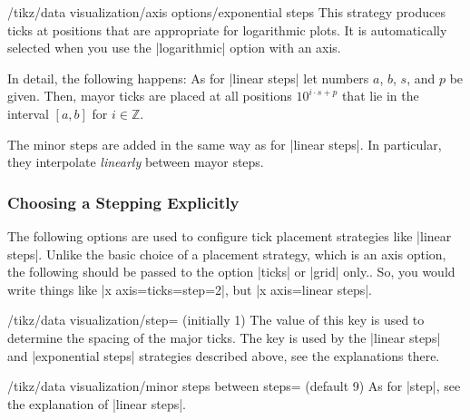\begin{key}{/tikz/data visualization/axis options/exponential steps}
  This strategy produces ticks at positions that are appropriate for
  logarithmic plots. It is automatically selected when you use the
  |logarithmic| option with an axis.

  In detail, the following happens: As for |linear steps| let numbers
  $a$, $b$, $s$, and $p$ be given. Then, mayor ticks are placed at all
  positions $10^{i\cdot s+p}$ that lie in the interval $[a,b]$ for $i
  \in \mathbb Z$.

  The minor steps are added in the same way as for |linear steps|. In
  particular, they interpolate \emph{linearly} between mayor steps.

\begin{codeexample}[]
\end{codeexample}
\end{key}




\subsubsection{Choosing a Stepping Explicitly}

The following options are used to configure tick placement strategies
like |linear steps|. Unlike the basic choice of a placement strategy,
which is an axis option, the following should be passed to the option
|ticks| or |grid| only.. So, you would write
things like |x axis={ticks={step=2}}|, but |x axis=linear steps|.

\begin{key}{/tikz/data visualization/step= (initially 1)}
  The value of this key is used to determine the spacing of the major
  ticks. The key is used by the |linear steps| and |exponential steps|
  strategies described above, see the explanations there.
\end{key}

\begin{key}{/tikz/data visualization/minor steps between
    steps= (default 9)}
  As for |step|, see the explanation of |linear steps|.
\end{key}

